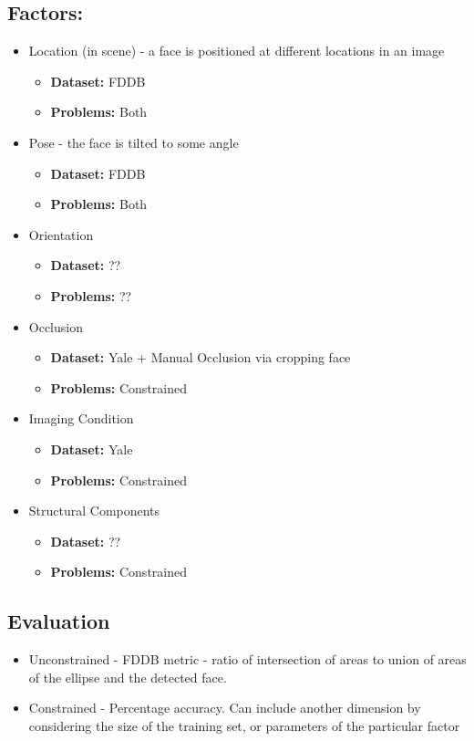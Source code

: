 \documentclass[11pt]{article} %
\theoremstyle{plain}
\theoremstyle{definition}
\theoremstyle{remark}
\numberwithin{equation}{section} %
\numberwithin{figure}{section} %
\numberwithin{table}{section} %
\begin{document}
\subsection{Factors:}
\begin{itemize}
  \item Location (in scene) - a face is positioned at different locations in an image
  \begin{itemize}
    \item \textbf{Dataset:} FDDB
    \item \textbf{Problems:} Both 
  \end{itemize}
  \item Pose - the face is tilted to some angle
  \begin{itemize}
    \item \textbf{Dataset:} FDDB
    \item \textbf{Problems:} Both 
  \end{itemize}
    \item Orientation
  \begin{itemize}
    \item \textbf{Dataset:} ??
    \item \textbf{Problems:} ??
  \end{itemize}
  \item Occlusion
  \begin{itemize}
    \item \textbf{Dataset:} Yale + Manual Occlusion via cropping face
    \item \textbf{Problems:} Constrained 
  \end{itemize}
  \item Imaging Condition
  \begin{itemize}
    \item \textbf{Dataset:} Yale
    \item \textbf{Problems:} Constrained
  \end{itemize}
  \item Structural Components

  \begin{itemize}
    \item \textbf{Dataset:} ??
    \item \textbf{Problems:} Constrained
  \end{itemize}
\end{itemize}

\subsection{Evaluation}

\begin{itemize}
  \item Unconstrained - FDDB metric - ratio of intersection of areas to union of areas of the ellipse and the detected face.
  \item Constrained - Percentage accuracy. Can include another dimension by considering the size of the training set, or parameters of the particular factor
\end{itemize}




\end{document}
